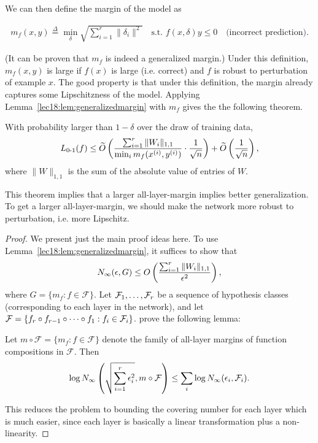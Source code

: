 We can then define the margin of the model as 

\begin{align}
    m_f(x,y) \overset{\Delta}{=} \min_{\delta} \sqrt{\sum_{i=1}^r \|\delta_i \|^2} \quad \text{s.t. } f(x, \delta) y \leq 0 \quad \text{(incorrect prediction)}.
\end{align}

(It can be proven that $m_f$ is indeed a generalized margin.) Under this definition, $m_f(x,y)$ is large if $f(x)$ is large (i.e. correct) and $f$ is robust to perturbation of example $x$. The good property is that under this definition, the margin already captures some Lipschitzness of the model. Applying Lemma~\ref{lec18:lem:generalizedmargin} with $m_f$ gives the the following theorem.

\begin{theorem}
\label{lec18:thm:alllayermargin}
With probability larger than $1-\delta$ over the draw of training data, 
\begin{align}
    L_{\textup{0-1}} (f) \le \widetilde{O} \left( \frac{\sum_{i=1}^r \|W_i \|_{1,1}}{\min_i m_f(x^{(i)}, y^{(i)})} \cdot \frac{1}{\sqrt{n}} \right) + \widetilde{O} \left( \frac{1}{\sqrt{n}} \right),
\end{align}
where $\| W \|_{1,1}$ is the sum of the absolute value of entries of $W$.
\end{theorem}

This theorem implies that a larger all-layer-margin implies better generalization. To get a larger all-layer-margin, we should make the network more robust to perturbation, i.e. more Lipschitz.

\begin{proof}
We present just the main proof ideas here. To use Lemma~\ref{lec18:lem:generalizedmargin}, it suffices to show that
\begin{equation}
N_\infty (\epsilon, G) \leq O \left( \frac{\sum_{i=1}^r \| W_i \|_{1,1} }{\epsilon^2} \right),
\end{equation}
where $G = \{ m_f : f \in \mathcal{F} \}$. Let $\mathcal F_1, \dots, \mathcal F_r$ be a sequence of hypothesis classes (corresponding to each layer in the network), and let $\mathcal F = \{ f_r \circ f_{r-1} \circ \dots \circ f_1: f_i \in \mathcal F_i \}$. \cite{wei2019improved} prove the following lemma:

\begin{lemma}
\label{lec18:lem:decomposition}
Let $m \circ \mathcal{F} = \{ m_f : f \in \mathcal{F}\}$ denote the family of all-layer margins of function compositions in $\mathcal{F}$. Then
\begin{align*}
    \log N_\infty \left( \sqrt{\sum_{i=1}^r \epsilon_i^2} , m\circ \mathcal{F} \right) \le \sum_i \log N_\infty (\epsilon_i, \mathcal{F}_i).
\end{align*}
\end{lemma}

This reduces the problem to bounding the covering number for each layer which is much easier, since each layer is basically a linear transformation plus a non-linearity.
\end{proof}

